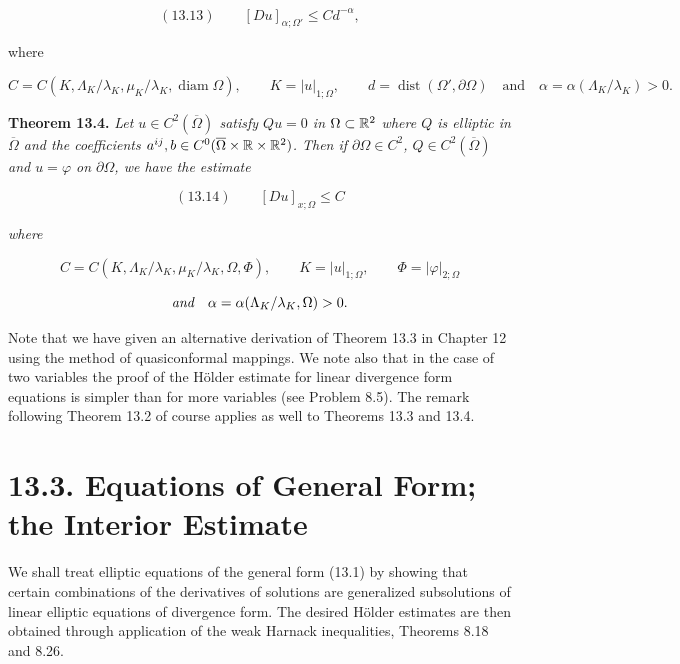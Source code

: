\[
(13.13)\qquad [Du]_{\alpha;\Omega'} \leq Cd^{-\alpha},
\]




where

\[
C = C(K,\Lambda_K/\lambda_K,\mu_K/\lambda_K,\operatorname{diam}\Omega),
\qquad K = |u|_{1;\Omega}, \qquad d = \operatorname{dist}(\Omega',\partial\Omega)
\quad \text{and} \quad \alpha = \alpha(\Lambda_K/\lambda_K) > 0.
\]

\begin{theorem}\label{thm:gt13-holder-gradient-13-4}
\textbf{Theorem 13.4.} \emph{Let $u \in C^2(\overline{\Omega})$ satisfy $Qu = 0$ in $\Omega \subset \mathbb{R}^2$ where $Q$ is elliptic in $\overline{\Omega}$ and the coefficients $a^{ij}, b \in C^0(\overline{\Omega} \times \mathbb{R} \times \mathbb{R}^2)$. Then if $\partial\Omega \in C^2$, $Q \in C^2(\overline{\Omega})$ and $u = \varphi$ on $\partial\Omega$, we have the estimate}
\end{theorem}

\[
(13.14)\qquad [Du]_{x;\Omega} \leq C
\]

\emph{where}

\[
C = C(K,\Lambda_K/\lambda_K,\mu_K/\lambda_K,\Omega,\Phi),
\qquad K = |u|_{1;\Omega}, \qquad \Phi = |\varphi|_{2;\Omega}
\]

\[
\emph{and} \quad \alpha = \alpha(\Lambda_K/\lambda_K,\Omega) > 0.
\]

Note that we have given an alternative derivation of Theorem 13.3 in Chapter
12 using the method of quasiconformal mappings. We note also that in the case of
two variables the proof of the H\"older estimate for linear divergence form equations
is simpler than for more variables (see Problem 8.5). The remark following Theorem
13.2 of course applies as well to Theorems 13.3 and 13.4.

\section*{13.3. Equations of General Form; the Interior Estimate}

We shall treat elliptic equations of the general form (13.1) by showing that certain
combinations of the derivatives of solutions are generalized subsolutions of linear
elliptic equations of divergence form. The desired H\"older estimates are then
obtained through application of the weak Harnack inequalities, Theorems 8.18
and 8.26.

